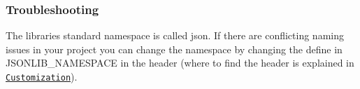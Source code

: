 \subsubsection*{\label{_troubleshooting_section}%
Troubleshooting}


\begin{DoxyItemize}
\item The libraries standard namespace is called {\ttfamily json}. If there are conflicting naming issues in your project you can change the namespace by changing the define in {\ttfamily J\+S\+O\+N\+L\+I\+B\+\_\+\+N\+A\+M\+E\+S\+P\+A\+CE} in the header (where to find the header is explained in \href{#customization_section}{\tt Customization}). 
\end{DoxyItemize}